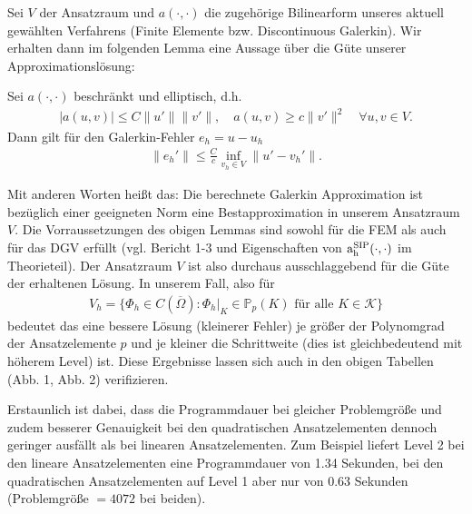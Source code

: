 Sei $V$ der Ansatzraum und $a(\cdot,\cdot)$ die zugehörige Bilinearform unseres aktuell gewählten Verfahrens (Finite Elemente bzw. Discontinuous Galerkin).
Wir erhalten dann im folgenden Lemma eine Aussage über die Güte unserer Approximationslösung:

\begin{Lemma}
  Sei $a(\cdot,\cdot)$ beschränkt und elliptisch, d.h.
  \begin{align*}
    |a(u,v)| \le C \|u'\| \|v'\|, \quad a(u,v) \ge c \| v'\|^2
    \quad \forall u,v \in V.
  \end{align*}
  Dann gilt für den Galerkin-Fehler $e_h = u-u_h$
  \begin{align*}
    \| e_h' \| \le \frac{C}{c} \inf\limits_{v_h \in V}
    \| u'-v_h' \|.
  \end{align*}
\end{Lemma}
Mit anderen Worten heißt das: Die berechnete Galerkin Approximation ist bezüglich einer geeigneten Norm eine Bestapproximation in unserem Ansatzraum $V$.
Die Vorraussetzungen des obigen Lemmas sind sowohl für die FEM als auch für das DGV erfüllt (vgl. Bericht 1-3 und
Eigenschaften von $ \operatorname{a_h^{\text{SIP}}}(\cdot,\cdot) $ im Theorieteil).
Der Ansatzraum $V$ ist also durchaus ausschlaggebend für die Güte der erhaltenen Lösung. 
In unserem Fall, also für 
\begin{align*}
	V_h = \{ \Phi_h \in C(\overline{\Omega}): \Phi_h|_K \in \mathbb{P}_p(K) \text{ für alle } K \in \mathcal{K}\}
\end{align*}
bedeutet das eine bessere Lösung (kleinerer Fehler) je größer der Polynomgrad der Ansatzelemente $p$ und je kleiner die Schrittweite (dies ist gleichbedeutend mit höherem Level) ist.
Diese Ergebnisse lassen sich auch in den obigen Tabellen (Abb. 1, Abb. 2) verifizieren.

Erstaunlich ist dabei, dass die Programmdauer bei gleicher Problemgröße und zudem besserer Genauigkeit bei den quadratischen Ansatzelementen dennoch geringer ausfällt als bei linearen Ansatzelementen. Zum Beispiel liefert Level 2 bei den lineare Ansatzelementen eine Programmdauer von 1.34 Sekunden, bei den quadratischen Ansatzelementen auf Level 1 aber nur von 0.63 Sekunden (Problemgröße $=4072$ bei beiden).



